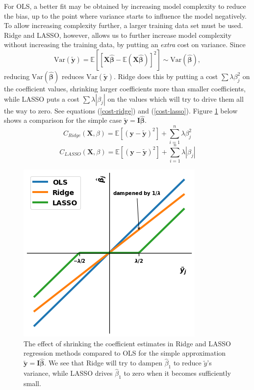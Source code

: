 \documentclass[]{article}
\begin{document}
For OLS, a better fit may be obtained by increasing model complexity to reduce the bias, up to the point where variance starts to influence the model negatively. To allow increasing complexity further, a larger training data set must be used. Ridge and LASSO, however, allows us to further increase model complexity without increasing the training data, by putting an \textit{extra} cost on variance. Since 
\begin{equation}
	\mathrm{Var}(\mathbf{\tilde{y}}) = \mathbb{E}[[\mathbf{X \hat{\beta}} - \mathbb{E}(\mathbf{X \hat{\beta}})]^2] \sim \mathrm{Var}(\mathbf{\hat{\beta}}),
\end{equation}
reducing $\mathrm{Var}(\mathbf{\hat{\beta}})$ reduces $\mathrm{Var}(\mathbf{\tilde{y}})$. Ridge does this by putting a cost $\sum \lambda \beta_j^2$ on the coefficient values, shrinking larger coefficients more than smaller coefficients, while LASSO puts a cost $\sum \lambda |\beta_j|$ on the values which will try to drive them all the way to zero. See equations (\ref{cost-ridge}) and (\ref{cost-lasso}). Figure \ref{fig:ols-ridge-lasso-comp} below shows a comparison for the simple case $\mathbf{\tilde{y}} = \mathbf{I\hat{\beta}}$.
\begin{equation}
\label{cost-ridge}
C_{Ridge}(\mathbf{X},\mathbb{\beta}) = \mathbb{E}[(\mathbf{y} - \mathbf{\tilde{y}})^2] + \sum_{i=1}^{n} \lambda \beta_j^2
\end{equation}
\begin{equation}
\label{cost-lasso}
C_{LASSO}(\mathbf{X},\mathbb{\beta}) = \mathbb{E}[(\mathbf{y} - \mathbf{\tilde{y}})^2] + \sum_{i=1}^{n} \lambda |\beta_j|
\end{equation}

\begin{figure}[!htb]
	\centering
	\includegraphics[width=.5\linewidth]{./results/ols-ridge-lasso-comp.png}
	\caption{The effect of shrinking the coefficient estimates in Ridge and LASSO regression methods compared to OLS for the simple approximation $\mathbf{\tilde{y}} = \mathbf{I\hat{\beta}}$. We see that Ridge will try to dampen $\hat{\beta}_1$ to reduce $\tilde{y}$'s variance, while LASSO drives $\hat{\beta}_1$ to zero when it becomes sufficiently small.}
	\label{fig:ols-ridge-lasso-comp}
\end{figure}
\end{document}
